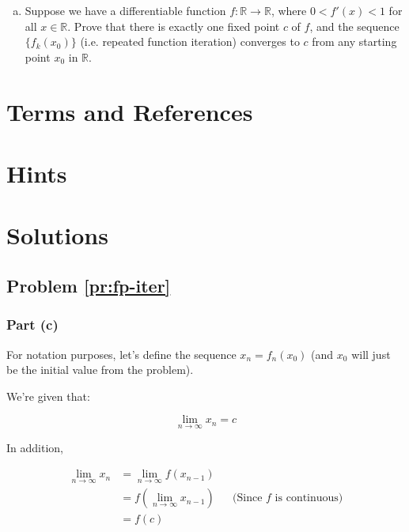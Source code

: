 \begin{problem}
\qquad
\begin{enumerate}[(a)]
\item Suppose we have a differentiable function $f: \mathbb{R} \rightarrow \mathbb{R}$, where $0 < f'(x) < 1$ for all $x \in \mathbb{R}$. Prove that there is exactly one fixed point $c$ of $f$, and the sequence $\{f_k(x_0)\}$ (i.e. repeated function iteration) converges to $c$ from any starting point $x_0$ in $\mathbb{R}$. 

\end{enumerate}
\end{problem}


\newpage
\section{Terms and References}

\section{Hints}

\newpage
\section{Solutions}

\subsection{Problem \ref{pr:fp-iter}}

\subsubsection{Part (c)}

For notation purposes, let's define the sequence $x_n = f_n(x_0)$ (and $x_0$ will just be the initial value from the problem).

We're given that:

\begin{equation*}
\lim_{n \rightarrow \infty} x_n = c
\end{equation*}

In addition,

\begin{align*}
\lim_{n \rightarrow \infty} x_n &= \lim_{n \rightarrow \infty} f(x_{n-1}) \\
&= f(\lim_{n \rightarrow \infty} x_{n-1}) && \text{(Since $f$ is continuous)} \\
&= f(c) \\
\end{align*}

